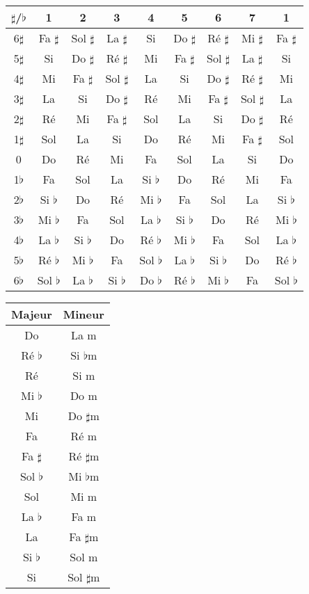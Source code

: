 \documentclass[11pt]{article}
\newcommand{\B}[0]
{$\flat$}
\newcommand{\D}[0]
{$\sharp$}
\begin{document}
\vspace{1cm}

\begin{tabular}{ | *{9}{c|} }
    \hline
    \D/\B & 1 & 2 & 3 & 4 & 5 & 6 & 7 & 1 \\
    \hline
    6\D & Fa \D & Sol \D & La \D & Si & Do \D & Ré \D & Mi \D & Fa \D \\
    \hline
    5\D & Si & Do \D & Ré \D & Mi & Fa \D & Sol \D & La \D & Si \\
    \hline
    4\D & Mi & Fa \D & Sol \D & La & Si & Do \D & Ré \D & Mi \\
    \hline
    3\D & La & Si & Do \D & Ré & Mi & Fa \D & Sol \D & La \\
    \hline
    2\D & Ré & Mi & Fa \D & Sol & La & Si & Do \D & Ré \\
    \hline
    1\D & Sol & La & Si & Do & Ré & Mi & Fa \D & Sol \\
    \hline
    0 & Do & Ré & Mi & Fa & Sol & La & Si & Do \\
    \hline
    1\B & Fa & Sol & La & Si \B & Do & Ré & Mi & Fa \\
    \hline
    2\B & Si \B & Do & Ré & Mi \B & Fa & Sol & La & Si \B \\
    \hline
    3\B & Mi \B & Fa & Sol & La \B & Si \B & Do & Ré & Mi \B \\
    \hline
    4\B & La \B & Si \B & Do & Ré \B & Mi \B & Fa & Sol & La \B \\
    \hline
    5\B & Ré \B & Mi \B & Fa & Sol \B & La \B & Si \B & Do & Ré \B \\
    \hline
    6\B & Sol \B & La \B & Si \B & Do \B & Ré \B & Mi \B & Fa & Sol \B \\
    \hline
\end{tabular}

\newpage

\begin{tabular}{ | *{2}{c|} }
    \hline
    Majeur & Mineur \\
    \hline
    Do & La m \\
    \hline
    Ré \B & Si \B m \\
    \hline
    Ré & Si m \\
    \hline
    Mi \B & Do m \\
    \hline
    Mi & Do \D m \\
    \hline
    Fa & Ré m \\
    \hline
    Fa \D & Ré \D m \\
    \hline
    Sol \B & Mi \B m \\
    \hline
    Sol & Mi m \\
    \hline
    La \B & Fa m \\
    \hline
    La & Fa \D m \\
    \hline
    Si \B & Sol m \\
    \hline
    Si & Sol \D m \\
    \hline
\end{tabular}
\end{document}
